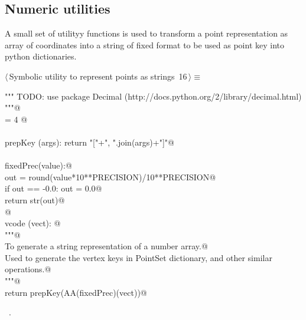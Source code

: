 \documentclass[11pt,oneside]{article}	%
\begin{document}
\subsection{Numeric utilities}

A small set of utilityy functions is used to transform a point representation as array of coordinates into a string of fixed format to be used as point key into python dictionaries.

\begin{flushleft} \small \label{scrap33}
\protect{}$\langle\,$Symbolic utility to represent points as strings\nobreak\ {\footnotesize 16}$\,\rangle\equiv$
\vspace{-1ex}
\begin{list}{}{} \item
\mbox{}\verb@""" TODO: use package Decimal (http://docs.python.org/2/library/decimal.html) """@\\
\mbox{}\verb@PRECISION = 4 @\\
\mbox{}\verb@@\\
\mbox{}\verb@def prepKey (args): return "["+", ".join(args)+"]"@\\
\mbox{}\verb@@\\
\mbox{}\verb@def fixedPrec(value):@\\
\mbox{}\verb@   out = round(value*10**PRECISION)/10**PRECISION@\\
\mbox{}\verb@   if out == -0.0: out = 0.0@\\
\mbox{}\verb@   return str(out)@\\
\mbox{}\verb@   @\\
\mbox{}\verb@def vcode (vect): @\\
\mbox{}\verb@   """@\\
\mbox{}\verb@   To generate a string representation of a number array.@\\
\mbox{}\verb@   Used to generate the vertex keys in PointSet dictionary, and other similar operations.@\\
\mbox{}\verb@   """@\\
\mbox{}\verb@   return prepKey(AA(fixedPrec)(vect))@\\
\mbox{}\verb@@{\NWsep}
\end{list}
\vspace{-1ex}
\footnotesize\addtolength{\baselineskip}{-1ex}
\begin{list}{}{\setlength{\itemsep}{-\parsep}\setlength{\itemindent}{-\leftmargin}}
\item \NWtxtMacroRefIn\ .
\end{list}
\end{flushleft}




\end{document}
